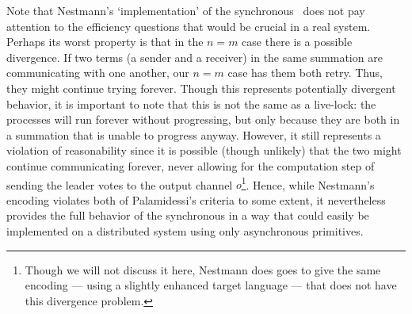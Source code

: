 Note that Nestmann's `implementation' of the synchronous \picalc\ does not pay attention to the efficiency questions that would be crucial in a real system.  Perhaps its worst property is that in the $n=m$ case there is a possible divergence.  If two terms (a sender and a receiver) in the same summation are communicating with one another, our $n=m$ case has them both retry.  Thus, they might continue trying forever.  Though this represents potentially divergent behavior, it is important to note that this is not the same as a live-lock: the processes will run forever without progressing, but only because they are both in a summation that is unable to progress anyway.  However, it still represents a violation of reasonability since it is possible (though unlikely) that the two might continue communicating forever, never allowing for the computation step of sending the leader votes to the output channel $o$\footnote{Though we will not discuss it here, Nestmann \cite{nestm00} does goes to give the same encoding --- using a slightly enhanced target language --- that does not have this divergence problem.}.  Hence, while Nestmann's encoding violates both of Palamidessi's criteria to some extent, it nevertheless provides the full behavior of the synchronous in a way that could easily be implemented on a distributed system using only asynchronous primitives.